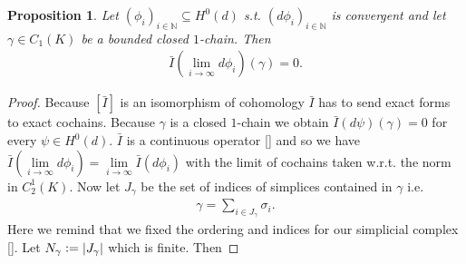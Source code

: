 \documentclass[12pt,a4paper]{article}
\newtheorem{proposition}{Proposition}
\theoremstyle{definition}
\newcommand{\aop}{\mathscr{A}}
\newcommand{\rop}{\mathscr{R}} %
\begin{document}
\begin{proposition}\label{integral_exact_form_zero}
    Let $(\phi_i)_{i\in\mathbb{N}} \subseteq H^0(d)$ s.t. 
    $(d\phi_i)_{i\in\mathbb{N}}$ 
    is convergent and let $\gamma \in C_1(K)$ be a bounded closed $1$-chain.
    Then
    \begin{align*}
        \bar{I}(\lim\limits_{i \rightarrow \infty}d\phi_i)(\gamma) = 0.
    \end{align*}
\end{proposition}
\begin{proof}
    
    Because 
    $[\bar{I}]$ is an isomorphism of cohomology $\bar{I}$ has to send 
    exact forms to exact cochains. Because $\gamma$ is a closed $1$-chain 
    we obtain $\bar{I}(d\psi)(\gamma) = 0$ for every $\psi \in H^0(d)$.
    $\bar{I}$ is a continuous operator \ref{} and so we have 
    $\bar{I}(\lim\limits_{i \rightarrow \infty}d\phi_i) = 
    \lim\limits_{i \rightarrow \infty} \bar{I}(d\phi_i)$ with the limit of 
    cochains taken w.r.t. the norm 
    in $C^1_2(K)$. Now let $J_\gamma$ be the set of indices of simplices 
    contained in $\gamma$ i.e.
    \begin{align*}
        \gamma = \sum\limits_{i \in J_\gamma} \sigma_i.
    \end{align*}
    Here we remind that we fixed the ordering and indices for our simplicial 
    complex \ref{}. Let $N_\gamma \vcentcolon= |J_\gamma|$ which is finite. Then 


\end{proof}
\end{document}
